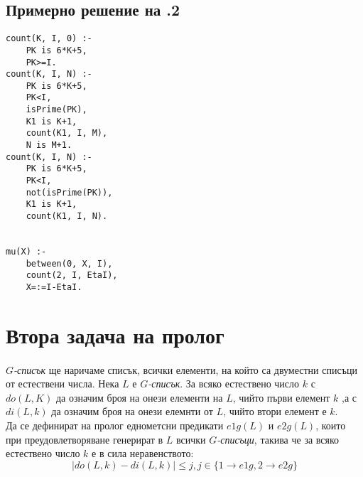 \documentclass[]{article}
\newenvironment{longlisting}{\captionsetup{type=listing}}{}
\begin{document}
\vskip 0.2in

\subsection{Примерно решение на .2} 
\begin{longlisting}
\begin{verbatim}
count(K, I, 0) :-
    PK is 6*K+5,
    PK>=I.
count(K, I, N) :-
    PK is 6*K+5,
    PK<I,
    isPrime(PK),
    K1 is K+1,
    count(K1, I, M),
    N is M+1.
count(K, I, N) :-
    PK is 6*K+5,
    PK<I,
    not(isPrime(PK)),
    K1 is K+1,
    count(K1, I, N).


mu(X) :-
    between(0, X, I),
    count(2, I, EtaI),
    X=:=I-EtaI.
\end{verbatim}
\end{longlisting}

\newpage
\section{Втора задача на пролог}

\paragraph{} 
$G$\emph{-списък} ще наричаме списък, всички елементи, на който са двуместни списъци от естествени числа. Нека $L$ е $G$\emph{-списък}. За всяко естествено число $k$ с $do(L, K)$ да означим броя на онези елементи на $L$, чийто първи елемент $k$ ,а с $di(L,k)$  да означим броя на онези елемнти от $L$, чийто втори елемент е $k$.\\
Да се дефинират на пролог еднометсни предикати $e1g(L)$ и $e2g(L)$, които при преудовлетворяване генерират в $L$ всички $G$\emph{-списъци}, такива че за всяко естествено число $k$ е в сила неравенството:
\begin{equation*}
    |do(L,k) - di(L, k)| \leq j, j \in \{1 \rightarrow e1g,2 \rightarrow e2g\}
\end{equation*}
\end{document}

